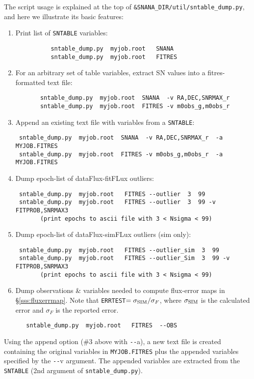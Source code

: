 \documentclass[12pt]{article}
\newcommand{\sigSIM}{\sigma_{\rm SIM}}
\newcommand{\sndump}{{\tt sntable\_dump.py}}
\begin{document}
{The script usage is explained at the top of
{\tt \&SNANA\_DIR/util/sntable\_dump.py},
and here we illustrate its basic features:
\begin{enumerate}
  \item Print list of {\tt SNTABLE} variables: 
       \begin{verbatim}
          sntable_dump.py  myjob.root   SNANA
          sntable_dump.py  myjob.root   FITRES
       \end{verbatim}
%
  \item For an arbitrary set of table variables, 
        extract SN values  into a fitres-formatted text file:
       \begin{verbatim}
       sntable_dump.py  myjob.root  SNANA  -v RA,DEC,SNRMAX_r
       sntable_dump.py  myjob.root  FITRES -v m0obs_g,m0obs_r
       \end{verbatim}
%
  \item Append an existing text file with variables from a {\tt SNTABLE}:
       \begin{verbatim}
 sntable_dump.py  myjob.root  SNANA  -v RA,DEC,SNRMAX_r  -a MYJOB.FITRES
 sntable_dump.py  myjob.root  FITRES -v m0obs_g,m0obs_r  -a MYJOB.FITRES
       \end{verbatim}
%
  \item Dump epoch-list of dataFlux-fitFLux  outliers:
       \begin{verbatim}
 sntable_dump.py  myjob.root   FITRES --outlier  3  99
 sntable_dump.py  myjob.root   FITRES --outlier  3  99 -v FITPROB,SNRMAX3
       (print epochs to ascii file with 3 < Nsigma < 99)
       \end{verbatim}
%
  \item Dump epoch-list of dataFlux-simFLux  outliers (sim only):
       \begin{verbatim}
 sntable_dump.py  myjob.root   FITRES --outlier_sim  3  99
 sntable_dump.py  myjob.root   FITRES --outlier_Sim  3  99 -v FITPROB,SNRMAX3
       (print epochs to ascii file with 3 < Nsigma < 99)
       \end{verbatim}
%
  \item Dump observations \& variables needed to compute flux-error maps 
      in \S\ref{sss:fluxerrmap}. Note that {\tt ERRTEST}$=\sigSIM/\sigma_F$,
      where $\sigSIM$ is the calculated error and $\sigma_F$ is the 
      reported error.
       \begin{verbatim}
   sntable_dump.py  myjob.root   FITRES  --OBS
       \end{verbatim}
\end{enumerate}
%
Using the append option (\#3 above with {\texttt{-{}-}a}), 
a new text file is created containing the original variables in 
{\tt MYJOB.FITRES} plus the appended variables specified by the
 \texttt{-{}-}v argument.
The appended variables are extracted from the {\tt SNTABLE}
(2nd argument of {\sndump}).

}
\end{document}
